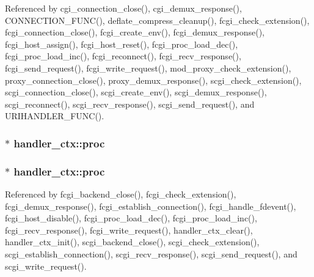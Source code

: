 Referenced by cgi\-\_\-connection\-\_\-close(), cgi\-\_\-demux\-\_\-response(), C\-O\-N\-N\-E\-C\-T\-I\-O\-N\-\_\-\-F\-U\-N\-C(), deflate\-\_\-compress\-\_\-cleanup(), fcgi\-\_\-check\-\_\-extension(), fcgi\-\_\-connection\-\_\-close(), fcgi\-\_\-create\-\_\-env(), fcgi\-\_\-demux\-\_\-response(), fcgi\-\_\-host\-\_\-assign(), fcgi\-\_\-host\-\_\-reset(), fcgi\-\_\-proc\-\_\-load\-\_\-dec(), fcgi\-\_\-proc\-\_\-load\-\_\-inc(), fcgi\-\_\-reconnect(), fcgi\-\_\-recv\-\_\-response(), fcgi\-\_\-send\-\_\-request(), fcgi\-\_\-write\-\_\-request(), mod\-\_\-proxy\-\_\-check\-\_\-extension(), proxy\-\_\-connection\-\_\-close(), proxy\-\_\-demux\-\_\-response(), scgi\-\_\-check\-\_\-extension(), scgi\-\_\-connection\-\_\-close(), scgi\-\_\-create\-\_\-env(), scgi\-\_\-demux\-\_\-response(), scgi\-\_\-reconnect(), scgi\-\_\-recv\-\_\-response(), scgi\-\_\-send\-\_\-request(), and U\-R\-I\-H\-A\-N\-D\-L\-E\-R\-\_\-\-F\-U\-N\-C().

\hypertarget{structhandler__ctx_a8722a28e5d9e229cbe6fe97b697a0f86}{
\subsubsection[{proc}]{$\ast$ handler\-\_\-ctx\-::proc}}\label{structhandler__ctx_a8722a28e5d9e229cbe6fe97b697a0f86}
\hypertarget{structhandler__ctx_a7f2db1cd3b7b0132c3b8b6a35b27e554}{
\subsubsection[{proc}]{$\ast$ handler\-\_\-ctx\-::proc}}\label{structhandler__ctx_a7f2db1cd3b7b0132c3b8b6a35b27e554}


Referenced by fcgi\-\_\-backend\-\_\-close(), fcgi\-\_\-check\-\_\-extension(), fcgi\-\_\-demux\-\_\-response(), fcgi\-\_\-establish\-\_\-connection(), fcgi\-\_\-handle\-\_\-fdevent(), fcgi\-\_\-host\-\_\-disable(), fcgi\-\_\-proc\-\_\-load\-\_\-dec(), fcgi\-\_\-proc\-\_\-load\-\_\-inc(), fcgi\-\_\-recv\-\_\-response(), fcgi\-\_\-write\-\_\-request(), handler\-\_\-ctx\-\_\-clear(), handler\-\_\-ctx\-\_\-init(), scgi\-\_\-backend\-\_\-close(), scgi\-\_\-check\-\_\-extension(), scgi\-\_\-establish\-\_\-connection(), scgi\-\_\-recv\-\_\-response(), scgi\-\_\-send\-\_\-request(), and scgi\-\_\-write\-\_\-request().

